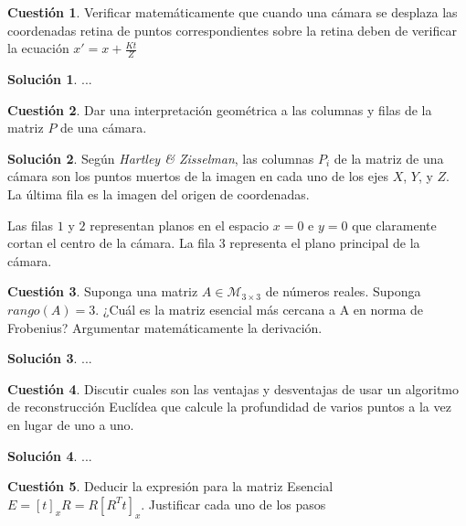 \documentclass[a4paper, 11pt]{article}
\theoremstyle{definition}
\newtheorem{cuestion}{Cuestión}
\newtheorem*{solucion}{Solución}
\begin{document}
  \begin{cuestion}
    Verificar matemáticamente que cuando una cámara se desplaza las coordenadas retina de
puntos correspondientes sobre la retina deben de verificar la ecuación $ x' = x + \frac{Kt}{Z} $

  \end{cuestion}

  \begin{solucion}
      ...
  \end{solucion}

  \begin{cuestion}
    Dar una interpretación geométrica a las columnas y filas de la matriz $P$ de una cámara.
  \end{cuestion}

  \begin{solucion} %
    Según \emph{Hartley \& Zisselman}, las columnas $P_i$ de la matriz de una cámara son
    los puntos muertos de la imagen en cada uno de los ejes $X$, $Y$, y $Z$. La última fila
    es la imagen del origen de coordenadas.

    Las filas $1$ y $2$ representan planos en el espacio $x=0$ e $y=0$ que claramente
    cortan el centro de la cámara. La fila $3$ representa el plano principal de la cámara.
  \end{solucion}

  \begin{cuestion}
    Suponga una matriz $ A \in \mathcal{M}_{3\times3}$ de números reales.
    Suponga $rango(A)=3$. ¿Cuál es la matriz esencial más cercana a A en norma de Frobenius?
    Argumentar matemáticamente la derivación.
  \end{cuestion}

  \begin{solucion}
    ...
  \end{solucion}

  \begin{cuestion}
    Discutir cuales son las ventajas y desventajas de usar un algoritmo de reconstrucción
    Euclídea que calcule la profundidad de varios puntos a la vez en lugar de uno a uno.

  \end{cuestion}

  \begin{solucion}
      ...
  \end{solucion}

  \begin{cuestion}
    Deducir la expresión para la matriz Esencial $E = [t]_x R = R[R^Tt]_x$.
    Justificar cada uno de los pasos

  \end{cuestion}
\end{document}
